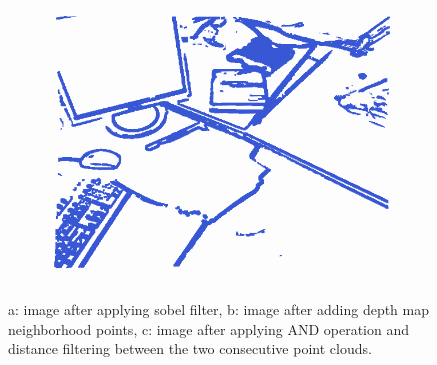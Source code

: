 \begin{figure}[H]
\begin{center}
\begin{subfigure}[b]{0.3\textwidth}
\includegraphics[scale=0.2]{images/borders_steps3.png}
\caption{}
\end{subfigure}
\caption{a: image after applying sobel filter, b: image after adding depth map neighborhood points, 
c: image after applying AND operation and distance filtering between the two consecutive point clouds.}
\end{center}
\end{figure}

